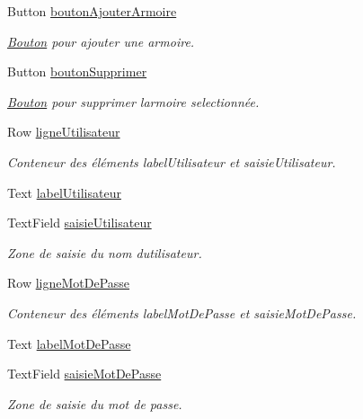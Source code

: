 \begin{DoxyCompactItemize}
Button \hyperlink{class_i_h_m_principale_ab457731ac1a790cc8c5023c2ac171f64}{bouton\+Ajouter\+Armoire}
\begin{DoxyCompactList}\small\item\em \hyperlink{class_bouton}{Bouton} pour ajouter une armoire. \end{DoxyCompactList}\item 
Button \hyperlink{class_i_h_m_principale_a579fd7e9be92899f0ed68c22a6254088}{bouton\+Supprimer}
\begin{DoxyCompactList}\small\item\em \hyperlink{class_bouton}{Bouton} pour supprimer l\textquotesingle{}armoire selectionnée. \end{DoxyCompactList}\item 
Row \hyperlink{class_i_h_m_principale_aa992669dfd7b7a6361ab39b3fad1b80c}{ligne\+Utilisateur}
\begin{DoxyCompactList}\small\item\em Conteneur des éléments label\+Utilisateur et saisie\+Utilisateur. \end{DoxyCompactList}\item 
Text \hyperlink{class_i_h_m_principale_a1dd943be265f7a65f7cb39de68862215}{label\+Utilisateur}
\item 
Text\+Field \hyperlink{class_i_h_m_principale_a2fd14b39a5cb27b218cf843bc4a476a3}{saisie\+Utilisateur}
\begin{DoxyCompactList}\small\item\em Zone de saisie du nom d\textquotesingle{}utilisateur. \end{DoxyCompactList}\item 
Row \hyperlink{class_i_h_m_principale_a40bb58212eb78e1eba26b5c8caceaee1}{ligne\+Mot\+De\+Passe}
\begin{DoxyCompactList}\small\item\em Conteneur des éléments label\+Mot\+De\+Passe et saisie\+Mot\+De\+Passe. \end{DoxyCompactList}\item 
Text \hyperlink{class_i_h_m_principale_a4625e89f0e2e938f52637dc4e41e48c8}{label\+Mot\+De\+Passe}
\item 
Text\+Field \hyperlink{class_i_h_m_principale_acaaa5d28f87d80c7b6e6796bd822d0c7}{saisie\+Mot\+De\+Passe}
\begin{DoxyCompactList}\small\item\em Zone de saisie du mot de passe. \end{DoxyCompactList}\item 

\end{DoxyCompactItemize}
